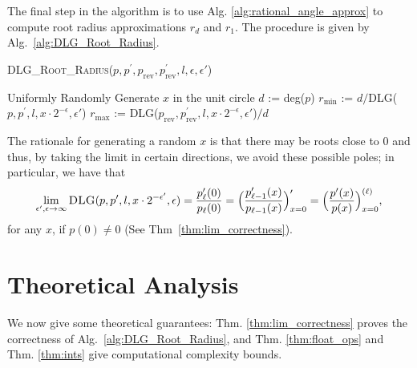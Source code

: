 \documentclass[runningheads]{llncs}
\begin{document}
The final step in the algorithm is to use Alg. \ref{alg:rational_angle_approx} to compute root radius approximations $r_d$ and $r_1$.
The procedure is given by Alg.~\ref{alg:DLG_Root_Radius}.
\begin{algorithm}
\caption{\textsc{DLG\_Root\_Radius}($p,p^\prime,p_\mathrm{rev},p^\prime_\mathrm{rev},l, \epsilon, \epsilon' $)}
\label{alg:DLG_Root_Radius}
\begin{algorithmic}
\STATE Uniformly Randomly Generate $x $ in the unit circle
\STATE $d$ := deg($p$)
\STATE $r_\mathrm{min} $ := $d/$\textsc{DLG}($p,p^\prime ,l,x\cdot 2^{-\epsilon}, \epsilon'$)
\STATE $r_\mathrm{max} $ := \textsc{DLG}($p_\mathrm{rev},p^\prime _\mathrm{rev},l,x\cdot 2^{-\epsilon}, \epsilon'$)$/d$
\end{algorithmic}
\end{algorithm}
The rationale for generating a random $x$ is that there may be roots close to 0 and thus, by taking the limit in certain directions, we avoid these possible poles; in particular, we have that
\begin{equation}\label{eq:lim_DLG}
  \lim_{ \epsilon',\epsilon \to \infty }  \textsc{DLG}(p,p^\prime ,l,x\cdot 2^{-\epsilon'}, \epsilon ) = \frac{p_{{\ell}}'(0)}{p_{\ell}(0)}=\Big(\frac{p_{\ell-1}'(x)}{p_{\ell-1}(x)}\Big)_{x=0}'=\Big(\frac{p'(x)}{p(x)}\Big)_{x=0}^{(\ell)},
\end{equation}
for any $x$, if $p(0) \neq 0$ (See Thm~\ref{thm:lim_correctness}).





\section{Theoretical Analysis}
\label{sec:the_ana}
We now give some theoretical guarantees: Thm. \ref{thm:lim_correctness} proves the correctness of Alg.~\ref{alg:DLG_Root_Radius}, and Thm. \ref{thm:float_ops} and Thm. \ref{thm:ints} give computational complexity bounds.
\end{document}
